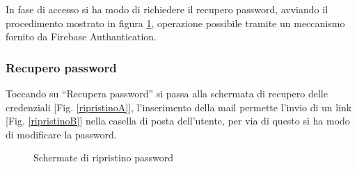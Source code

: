\documentclass[12pt,a4paper,openright,twoside]{report}
\begin{document}
In fase di accesso si ha modo di richiedere il recupero password, avviando il procedimento mostrato in figura \ref{ripristino}, operazione possibile tramite un meccanismo fornito da Firebase Authantication.

\subsubsection{Recupero password}
Toccando su ``Recupera password'' si passa alla schermata di recupero delle credenziali [Fig. \ref{ripristinoA}], l'inserimento della mail permette l'invio di un link [Fig. \ref{ripristinoB}] nella casella di posta dell'utente, per via di questo si ha modo di modificare la password.

\begin{figure}[H]
\centering
{} \quad
{} \quad
\caption{Schermate di ripristino password}
\label{ripristino}
\end{figure}
\end{document}
